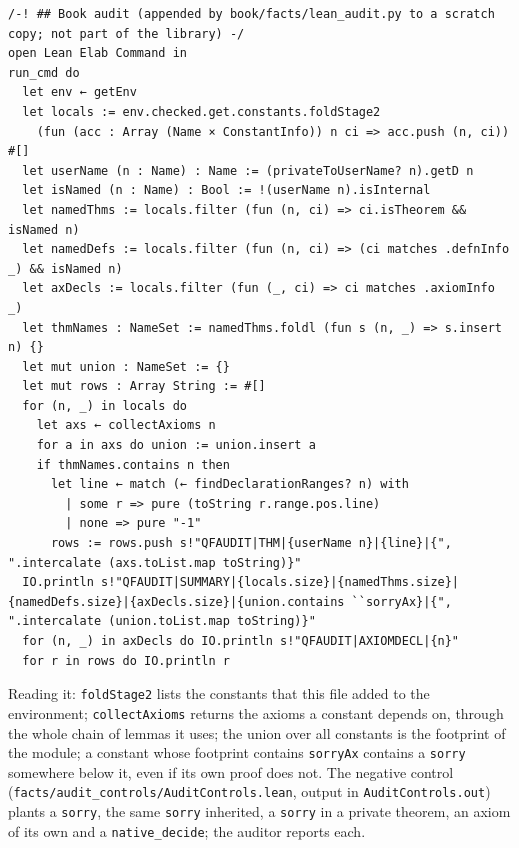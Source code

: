 \begin{lstlisting}[style=lean]
/-! ## Book audit (appended by book/facts/lean_audit.py to a scratch copy; not part of the library) -/
open Lean Elab Command in
run_cmd do
  let env ← getEnv
  let locals := env.checked.get.constants.foldStage2
    (fun (acc : Array (Name × ConstantInfo)) n ci => acc.push (n, ci)) #[]
  let userName (n : Name) : Name := (privateToUserName? n).getD n
  let isNamed (n : Name) : Bool := !(userName n).isInternal
  let namedThms := locals.filter (fun (n, ci) => ci.isTheorem && isNamed n)
  let namedDefs := locals.filter (fun (n, ci) => (ci matches .defnInfo _) && isNamed n)
  let axDecls := locals.filter (fun (_, ci) => ci matches .axiomInfo _)
  let thmNames : NameSet := namedThms.foldl (fun s (n, _) => s.insert n) {}
  let mut union : NameSet := {}
  let mut rows : Array String := #[]
  for (n, _) in locals do
    let axs ← collectAxioms n
    for a in axs do union := union.insert a
    if thmNames.contains n then
      let line ← match (← findDeclarationRanges? n) with
        | some r => pure (toString r.range.pos.line)
        | none => pure "-1"
      rows := rows.push s!"QFAUDIT|THM|{userName n}|{line}|{", ".intercalate (axs.toList.map toString)}"
  IO.println s!"QFAUDIT|SUMMARY|{locals.size}|{namedThms.size}|{namedDefs.size}|{axDecls.size}|{union.contains ``sorryAx}|{", ".intercalate (union.toList.map toString)}"
  for (n, _) in axDecls do IO.println s!"QFAUDIT|AXIOMDECL|{n}"
  for r in rows do IO.println r
\end{lstlisting}
Reading it: \texttt{foldStage2} lists the constants that this file added to the environment; \texttt{collectAxioms} returns the axioms a constant depends on, through the whole chain of lemmas it uses; the union over all constants is the footprint of the module; a constant whose footprint contains \texttt{sorryAx} contains a \texttt{sorry} somewhere below it, even if its own proof does not. The negative control (\texttt{facts/\allowbreak{}audit\_\allowbreak{}controls/\allowbreak{}AuditControls.\allowbreak{}lean}, output in \texttt{AuditControls.\allowbreak{}out}) plants a \texttt{sorry}, the same \texttt{sorry} inherited, a \texttt{sorry} in a private theorem, an axiom of its own and a \texttt{native\_\allowbreak{}decide}; the auditor reports each.
